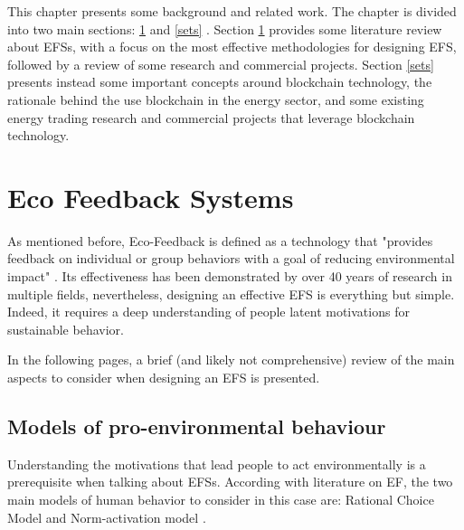 \cleardoublepage
\label{chap:back}

This chapter presents some background and related work. The chapter is divided into two main sections: \ref{sefs}  and \ref{sets} . Section \ref{sefs}  provides some literature review about \acp{EFS}, with a focus on the most effective methodologies for designing \ac{EFS}, followed by a review of some research and commercial projects. Section \ref{sets} presents instead some important concepts around blockchain technology, the rationale behind the use blockchain in the energy sector, and some existing energy trading research and commercial projects that leverage blockchain technology.


\section{Eco Feedback Systems} \label{sefs}

As mentioned before, Eco-Feedback is defined as a technology that "provides feedback on individual or group behaviors with a goal of reducing environmental impact" \cite{Froehlich2010}. Its effectiveness has been demonstrated by over 40 years of research in multiple fields, nevertheless, designing an effective \ac{EFS} is everything but simple. Indeed, it requires a deep understanding of people latent motivations for sustainable behavior.


In the following pages, a brief (and likely not comprehensive) review of the main aspects to consider when designing an \ac{EFS} is presented.


\subsection{Models of pro-environmental behaviour}

Understanding the motivations that lead people to act environmentally is a prerequisite when talking about \acp{EFS}. According with literature on \ac{EF}, the two main models of human behavior to consider in this case are: Rational Choice Model and Norm-activation model \cite{Froehlich2010}.



